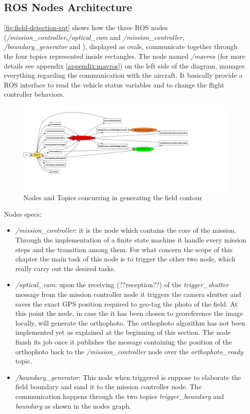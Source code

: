 \subsection{ROS Nodes Architecture} %
\label{sub:ros_nodes}
\autoref{fig:field-detection-rqt} shows how the three ROS nodes (\textit{/mission\_controller},\textit{/optical\_cam} and \textit{/mission\_controller}, \textit{/boundary\_generator} and ), displayed as ovals, communicate together through the four topics represented inside rectangles. The node named \textit{/mavros} (for more details see appendix \ref{appendix:mavros}) on the left side of the diagram, manages everything regarding the communication with the aircraft. It basically provide a ROS interface to read the vehicle status variables and to change the flight controller behaviors.\par
\begin{figure}[ht]
    \centering
    \includegraphics[width=1.3\textwidth]{figures/C2/fieldDetection-rqt_graph.pdf}
    \caption{Nodes and Topics concurring in generating the field contour}
    \label{fig:field-detection-rqt}
\end{figure}
Nodes specs:
\begin{itemize}
	\item \textit{/mission\_controller}: it is the node which contains the core of the mission. Through the implementation of a finite state machine it handle every mission steps and the transition among them. For what concern the scope of this chapter the main task of this node is to trigger the other two node, which really carry out the desired tasks.
	\item \textit{/optical\_cam}: upon the receiving (??reception??) of the \textit{trigger\_shutter} message from the mission controller node it triggers the camera shutter and saves the exact GPS position required to geo-tag the photo of the field.
	At this point the node, in case the it has been chosen to georeference the image locally, will generate the orthophoto. The orthophoto algorithm has not been implemented yet as explained at the beginning of this section.
	The node finish its job once it publishes the message containing the position of the orthophoto back to the \textit{/mission\_controller} node over the \textit{orthophoto\_ready} topic. 
	\item \textit{/boundary\_generator}: This node when triggered is suppose to elaborate the field boundary and sand it to the mission controller node. The communication happens through the two topics \textit{trigger\_boundary} and \textit{boundary} as shown in the nodes graph.
\end{itemize}
